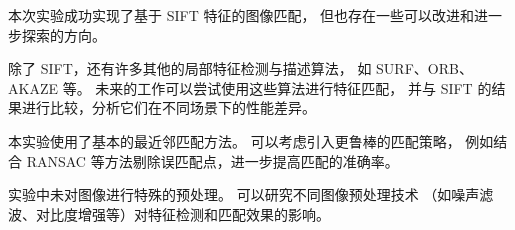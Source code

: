 
本次实验成功实现了基于 SIFT 特征的图像匹配，
但也存在一些可以改进和进一步探索的方向。

除了 SIFT，还有许多其他的局部特征检测与描述算法，
如 SURF、ORB、AKAZE 等。
未来的工作可以尝试使用这些算法进行特征匹配，
并与 SIFT 的结果进行比较，分析它们在不同场景下的性能差异。

本实验使用了基本的最近邻匹配方法。
可以考虑引入更鲁棒的匹配策略，
例如结合 RANSAC 等方法剔除误匹配点，进一步提高匹配的准确率。

实验中未对图像进行特殊的预处理。
可以研究不同图像预处理技术
（如噪声滤波、对比度增强等）对特征检测和匹配效果的影响。